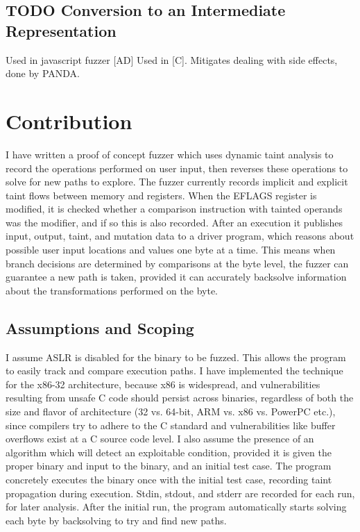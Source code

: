 \documentclass[11pt,expanded,copyright]{fsuthesis}
\begin{document}
\section{TODO Conversion to an Intermediate Representation}

Used in javascript fuzzer [AD]
Used in [C].
Mitigates dealing with side effects, done by PANDA.

\chapter{Contribution}

I have written a proof of concept fuzzer which uses dynamic taint analysis to record the operations performed on user input, then reverses these operations to solve for new paths to explore. The fuzzer currently records implicit and explicit taint flows between memory and registers. When the EFLAGS register is modified, it is checked whether a comparison instruction with tainted operands was the modifier, and if so this is also recorded. After an execution it publishes input, output, taint, and mutation data to a driver program, which reasons about possible user input locations and values one byte at a time. This means when branch decisions are determined by comparisons at the byte level, the fuzzer can guarantee a new path is taken, provided it can accurately backsolve information about the transformations performed on the byte.

\section{Assumptions and Scoping}

I assume ASLR is disabled for the binary to be fuzzed. This allows the program to easily track and compare execution paths. I have implemented the technique for the x86-32 architecture, because x86 is widespread, and vulnerabilities resulting from unsafe C code should persist across binaries, regardless of both the size and flavor of architecture (32 vs. 64-bit, ARM vs. x86 vs. PowerPC etc.), since compilers try to adhere to the C standard and vulnerabilities like buffer overflows exist at a C source code level. I also assume the presence of an algorithm which will detect an exploitable condition, provided it is given the proper binary and input to the binary, and an initial test case. The program concretely executes the binary once with the initial test case, recording taint propagation during execution. Stdin, stdout, and stderr are recorded for each run, for later analysis. After the initial run, the program automatically starts solving each byte by backsolving to try and find new paths.
\end{document}
